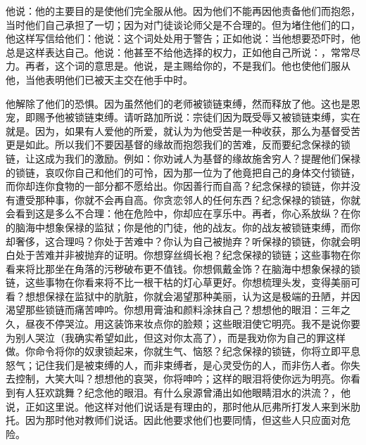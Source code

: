 他说：他的主要目的是使他们完全服从他。因为他们不能再因他责备他们而抱怨，当时他们自己承担了一切；因为对门徒谈论师父是不合理的。但为堵住他们的口，他这样写信给他们：他说：这个词处处用于警告；正如他说：当他想要恐吓时，他总是这样表达自己。他说：他甚至不给他选择的权力，正如他自己所说：，常常尽力。再者，这个词的意思是。他说，是主赐给你的，不是我们。他也使他们服从他，当他表明他们已被天主交在他手中时。\par

他解除了他们的恐惧。因为虽然他们的老师被锁链束缚，然而释放了他。这也是恩宠，即赐予他被锁链束缚。请听路加所说：宗徒们因为既受辱又被锁链束缚，实在就是。因为，如果有人爱他的所爱，就认为为他受苦是一种收获，那么为基督受苦更是如此。所以我们不要因基督的缘故而抱怨我们的苦难，反而要纪念保禄的锁链，让这成为我们的激励。例如：你劝诫人为基督的缘故施舍穷人？提醒他们保禄的锁链，哀叹你自己和他们的可怜，因为那一位为了他竟把自己的身体交付锁链，而你却连你食物的一部分都不愿给出。你因善行而自高？纪念保禄的锁链，你并没有遭受那种事，你就不会再自高。你贪恋邻人的任何东西？纪念保禄的锁链，你就会看到这是多么不合理：他在危险中，你却应在享乐中。再者，你心系放纵？在你的脑海中想象保禄的监狱；你是他的门徒，他的战友。你的战友被锁链束缚，而你却奢侈，这合理吗？你处于苦难中？你认为自己被抛弃？听保禄的锁链，你就会明白处于苦难并非被抛弃的证明。你想穿丝绸长袍？纪念保禄的锁链；这些事物在你看来将比那坐在角落的污秽破布更不值钱。你想佩戴金饰？在脑海中想象保禄的锁链，这些事物在你看来将不比一根干枯的灯心草更好。你想梳理头发，变得美丽可看？想想保禄在监狱中的肮脏，你就会渴望那种美丽，认为这是极端的丑陋，并因渴望那些锁链而痛苦呻吟。你想用膏油和颜料涂抹自己？想想他的眼泪：三年之久，昼夜不停哭泣。用这装饰来妆点你的脸颊；这些眼泪使它明亮。我不是说你要为别人哭泣（我确实希望如此，但这对你太高了），而是我劝你为自己的罪这样做。你命令将你的奴隶锁起来，你就生气、恼怒？纪念保禄的锁链，你将立即平息怒气；记住我们是被束缚的人，而非束缚者，是心灵受伤的人，而非伤人者。你失去控制，大笑大叫？想想他的哀哭，你将呻吟；这样的眼泪将使你远为明亮。你看到有人狂欢跳舞？纪念他的眼泪。有什么泉源曾涌出如他眼睛泪水的洪流？，他说，正如这里说。他这样对他们说话是有理由的，那时他从厄弗所打发人来到米肋托。因为那时他对教师们说话。因此他要求他们也要同情，但这些人只应面对危险。\par


